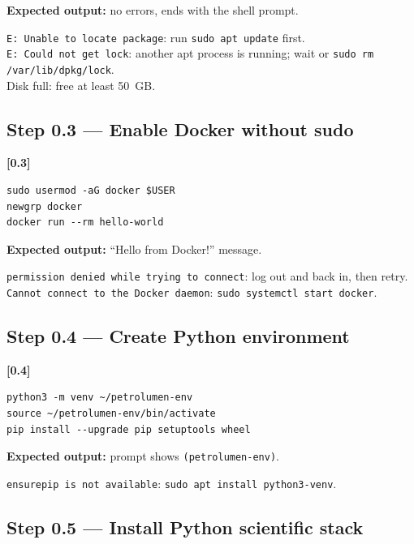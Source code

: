 \documentclass[10pt,a4paper]{article}
\newcommand{\stepID}[1]{\textsf{\textbf{[#1]}}}
\newcommand{\cmd}[1]{\texttt{#1}}
\begin{document}
\textbf{Expected output:} no errors, ends with the shell prompt.

\begin{failure}
\texttt{E: Unable to locate package}: run \cmd{sudo apt update} first.\\
\texttt{E: Could not get lock}: another apt process is running; wait or \cmd{sudo rm /var/lib/dpkg/lock}.\\
Disk full: free at least 50~GB.
\end{failure}

\subsection{Step 0.3 --- Enable Docker without sudo}

\stepID{0.3}
\begin{lstlisting}[style=sh]
sudo usermod -aG docker $USER
newgrp docker
docker run --rm hello-world
\end{lstlisting}

\textbf{Expected output:} ``Hello from Docker!'' message.

\begin{failure}
\texttt{permission denied while trying to connect}: log out and back in, then retry.\\
\texttt{Cannot connect to the Docker daemon}: \cmd{sudo systemctl start docker}.
\end{failure}

\subsection{Step 0.4 --- Create Python environment}

\stepID{0.4}
\begin{lstlisting}[style=sh]
python3 -m venv ~/petrolumen-env
source ~/petrolumen-env/bin/activate
pip install --upgrade pip setuptools wheel
\end{lstlisting}

\textbf{Expected output:} prompt shows \cmd{(petrolumen-env)}.

\begin{failure}
\texttt{ensurepip is not available}: \cmd{sudo apt install python3-venv}.
\end{failure}

\subsection{Step 0.5 --- Install Python scientific stack}
\end{document}
